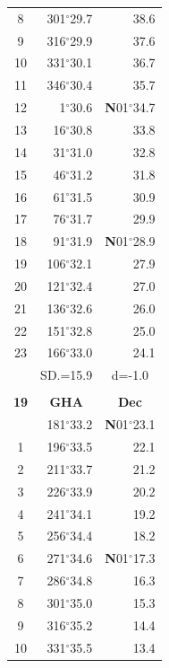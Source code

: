 \documentclass[10pt, a4paper]{report}
\begin{document}
\begin{scriptsize}
\begin{tabular*}{0.2\textwidth}[t]{@{\extracolsep{\fill}}|c|rr|}
8 & 301$^\circ$29.7 & 38.6\\
9 & 316$^\circ$29.9 & \raisebox{0.24ex}{\boldmath$\cdot$~\boldmath$\cdot$~~}37.6\\
10 & 331$^\circ$30.1 & 36.7\\
11 & 346$^\circ$30.4 & 35.7\\[2Pt]
12 & 1$^\circ$30.6 & \textbf{N}01$^\circ$34.7\\
13 & 16$^\circ$30.8 & 33.8\\
14 & 31$^\circ$31.0 & 32.8\\
15 & 46$^\circ$31.2 & \raisebox{0.24ex}{\boldmath$\cdot$~\boldmath$\cdot$~~}31.8\\
16 & 61$^\circ$31.5 & 30.9\\
17 & 76$^\circ$31.7 & 29.9\\[2Pt]
18 & 91$^\circ$31.9 & \textbf{N}01$^\circ$28.9\\
19 & 106$^\circ$32.1 & 27.9\\
20 & 121$^\circ$32.4 & 27.0\\
21 & 136$^\circ$32.6 & \raisebox{0.24ex}{\boldmath$\cdot$~\boldmath$\cdot$~~}26.0\\
22 & 151$^\circ$32.8 & 25.0\\
23 & 166$^\circ$33.0 & 24.1\\
\hline
\rule{0pt}{2.4ex} & \multicolumn{1}{c}{SD.=15.9} & \multicolumn{1}{c|}{d=-1.0}\\
\hline
\multicolumn{1}{c}{}\\[-0.5ex]\hline
\multicolumn{1}{|c|}{\rule{0pt}{2.6ex}\textbf{19}} & \multicolumn{1}{c}{\textbf{GHA}} & \multicolumn{1}{c|}{\textbf{Dec}}\\
\hline\rule{0pt}{2.6ex}\noindent
0 & 181$^\circ$33.2 & \textbf{N}01$^\circ$23.1\\
1 & 196$^\circ$33.5 & 22.1\\
2 & 211$^\circ$33.7 & 21.2\\
3 & 226$^\circ$33.9 & \raisebox{0.24ex}{\boldmath$\cdot$~\boldmath$\cdot$~~}20.2\\
4 & 241$^\circ$34.1 & 19.2\\
5 & 256$^\circ$34.4 & 18.2\\[2Pt]
6 & 271$^\circ$34.6 & \textbf{N}01$^\circ$17.3\\
7 & 286$^\circ$34.8 & 16.3\\
8 & 301$^\circ$35.0 & 15.3\\
9 & 316$^\circ$35.2 & \raisebox{0.24ex}{\boldmath$\cdot$~\boldmath$\cdot$~~}14.4\\
10 & 331$^\circ$35.5 & 13.4\\

\end{tabular*}
\end{scriptsize}
\end{document}
